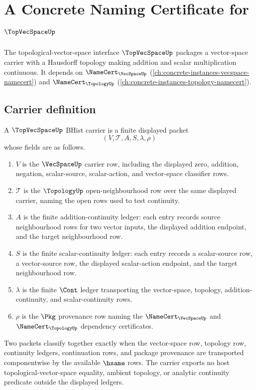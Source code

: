 \chapter{A Concrete Naming Certificate for $\TopVecSpaceUp$}
\label{ch:concrete-instances-topvecspace-namecert}

The topological-vector-space interface $\TopVecSpaceUp$ packages a vector-space carrier with a Hausdorff topology making addition and scalar multiplication continuous. It depends on $\NameCert_{\VecSpaceUp}$ (\autoref{ch:concrete-instances-vecspace-namecert}) and $\NameCert_{\TopologyUp}$ (\autoref{ch:concrete-instances-topology-namecert}).

\section{Carrier definition}
\label{sec:topvecspace-carrier}

\begin{definition}
\label{def:topvecspace-bhist-carrier}
A $\TopVecSpaceUp$ BHist carrier is a finite displayed packet
$$
(V,\mathcal T,A,S,\lambda,\rho)
$$
whose fields are as follows.
\begin{enumerate}
\item $V$ is the $\VecSpaceUp$ carrier row, including the displayed zero, addition, negation, scalar-source, scalar-action, and vector-space classifier rows.
\item $\mathcal T$ is the $\TopologyUp$ open-neighbourhood row over the same displayed carrier, naming the open rows used to test continuity.
\item $A$ is the finite addition-continuity ledger: each entry records source neighbourhood rows for two vector inputs, the displayed addition endpoint, and the target neighbourhood row.
\item $S$ is the finite scalar-continuity ledger: each entry records a scalar-source row, a vector-source row, the displayed scalar-action endpoint, and the target neighbourhood row.
\item $\lambda$ is the finite $\Cont$ ledger transporting the vector-space, topology, addition-continuity, and scalar-continuity rows.
\item $\rho$ is the $\Pkg$ provenance row naming the $\NameCert_{\VecSpaceUp}$ and $\NameCert_{\TopologyUp}$ dependency certificates.
\end{enumerate}
Two packets classify together exactly when the vector-space row, topology row, continuity ledgers, continuation rows, and package provenance are transported componentwise by the available $\hsame$ rows. The carrier exports no host topological-vector-space equality, ambient topology, or analytic continuity predicate outside the displayed ledgers.
\end{definition}

